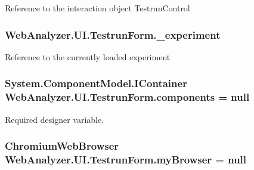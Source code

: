Reference to the interaction object Testrun\+Control 

\hypertarget{class_web_analyzer_1_1_u_i_1_1_testrun_form_a49db47e745ac60b4d6cee8104f0ce918}{}
\subsubsection[{\+\_\+experiment}]{ Web\+Analyzer.\+U\+I.\+Testrun\+Form.\+\_\+experiment\hspace{0.3cm}{\ttfamily [private]}}\label{class_web_analyzer_1_1_u_i_1_1_testrun_form_a49db47e745ac60b4d6cee8104f0ce918}


Reference to the currently loaded experiment 

\hypertarget{class_web_analyzer_1_1_u_i_1_1_testrun_form_a90f322118f120fb4bcc772f1d939d918}{}
\subsubsection[{components}]{\setlength{\rightskip}{0pt plus 5cm}System.\+Component\+Model.\+I\+Container Web\+Analyzer.\+U\+I.\+Testrun\+Form.\+components = null\hspace{0.3cm}{\ttfamily [private]}}\label{class_web_analyzer_1_1_u_i_1_1_testrun_form_a90f322118f120fb4bcc772f1d939d918}


Required designer variable. 

\hypertarget{class_web_analyzer_1_1_u_i_1_1_testrun_form_a8a98c5bfb1ce075cd3fbeadeb40f51fd}{}
\subsubsection[{my\+Browser}]{\setlength{\rightskip}{0pt plus 5cm}Chromium\+Web\+Browser Web\+Analyzer.\+U\+I.\+Testrun\+Form.\+my\+Browser = null\hspace{0.3cm}{\ttfamily [private]}}\label{class_web_analyzer_1_1_u_i_1_1_testrun_form_a8a98c5bfb1ce075cd3fbeadeb40f51fd}


